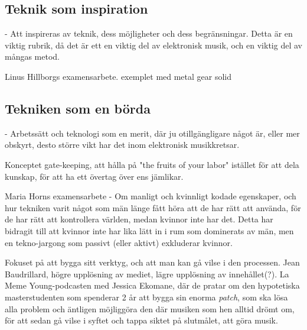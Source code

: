 \documentclass{article}
\begin{document}

\subsection{Teknik som inspiration}
- Att inspireras av teknik, dess möjligheter och dess begränsningar. Detta är en viktig rubrik, då det är ett
  en viktig del av elektronisk musik, och en viktig del av mångas metod. 

  Linus Hillborgs examensarbete. exemplet med metal gear solid

\subsection{Tekniken som en börda}
- Arbetssätt och teknologi som en merit, där ju otillgängligare något är, eller mer obskyrt, desto större vikt
  har det inom elektronisk musikkretsar. 

  Konceptet gate-keeping, att hålla på "the fruits of your labor" istället för att dela kunskap, för att ha
  ett övertag över ens jämlikar.

  Maria Horns examensarbete - Om manligt och kvinnligt kodade egenskaper, och hur tekniken varit något som män
  länge fått höra att de har rätt att använda, för de har rätt att kontrollera världen, medan kvinnor inte har
  det. Detta har bidragit till att kvinnor inte har lika lätt in i rum som dominerats av män, men en
  tekno-jargong som passivt (eller aktivt) exkluderar kvinnor. 

  Fokuset på att bygga sitt verktyg, och att man kan gå vilse i den processen. Jean Baudrillard, högre
  upplösning av mediet, lägre upplösning av innehållet(?). 
  La Meme Young-podcasten med Jessica Ekomane, där de pratar om den hypotetiska masterstudenten som spenderar
  2 år att bygga sin enorma \emph{patch}, som ska lösa alla problem och äntligen möjliggöra den där musiken
  som hen alltid drömt om, för att sedan gå vilse i syftet och tappa siktet på slutmålet, att göra musik. 


\end{document}
